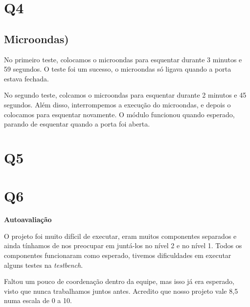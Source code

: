 \documentclass[12pt]{article}
\begin{document}
\section*{Q4}

\subsection*{Microondas)} No primeiro teste, colocamos o microondas para esquentar durante 3 minutos e 59 segundos. O teste foi um sucesso, o microondas só ligava quando a porta estava fechada.

No segundo teste, colcamos o microondas para esquentar durante 2 minutos e 45 segundos. Além disso, interrompemos a execução do microondas, e depois o colocamos para esquentar novamente. O módulo funcionou quando esperado, parando de esquentar quando a porta foi aberta.

\section*{Q5}


\section*{Q6}

\begin{center}
\textbf{Autoavaliação}
\end{center}

O projeto foi muito difícil de executar, eram muitos componentes separados e ainda tínhamos de nos preocupar em juntá-los no nível 2 e no nível 1. Todos os componentes funcionaram como esperado, tivemos dificuldades em executar alguns testes na \textit{testbench}.

Faltou um pouco de coordenação dentro da equipe, mas isso já era esperado, visto que nunca trabalhamos juntos antes.
Acredito que nosso projeto vale 8,5 numa escala de 0 a 10.
\end{document}
